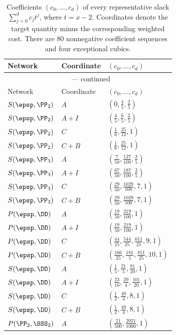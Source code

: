 \begingroup\renewcommand{\arraystretch}{1.25}
\begin{longtable}{lll}
\caption{Coefficients $(c_0,\ldots,c_d)$ of every representative slack $\sum_{j=0}^d c_jt^j$, where $t=x-2$. Coordinates denote the target quantity minus the corresponding weighted cost. There are 80 nonnegative coefficient sequences and four exceptional cubics.}\label{tab:slacks}\\
\toprule
Network & Coordinate & $(c_0,\ldots,c_d)$\\ \midrule
\endfirsthead
\multicolumn{3}{c}{\tablename~\thetable{} --- continued}\\[3pt]
\toprule
Network & Coordinate & $(c_0,\ldots,c_d)$\\ \midrule
\endhead
$S(\epsp,\PP_2)$ & $A$ & $(0, \frac{4}{5}, \frac{2}{5})$ \\
$S(\epsp,\PP_2)$ & $A+I$ & $(\frac{4}{5}, \frac{6}{5}, \frac{2}{5})$ \\
$S(\epsp,\PP_2)$ & $C$ & $(\frac{1}{6}, \frac{25}{12}, 1)$ \\
$S(\epsp,\PP_2)$ & $C+B$ & $(\frac{1}{6}, \frac{25}{12}, 1)$ \\
$S(\epsp,\PP_3)$ & $A$ & $(\frac{7}{50}, \frac{127}{100}, \frac{3}{5})$ \\
$S(\epsp,\PP_3)$ & $A+I$ & $(\frac{67}{50}, \frac{187}{100}, \frac{3}{5})$ \\
$S(\epsp,\PP_3)$ & $C$ & $(\frac{29}{50}, \frac{1029}{100}, 7, 1)$ \\
$S(\epsp,\PP_3)$ & $C+B$ & $(\frac{29}{50}, \frac{1029}{100}, 7, 1)$ \\
$P(\epsp,\DD)$ & $A$ & $(\frac{19}{50}, \frac{219}{100}, 1)$ \\
$P(\epsp,\DD)$ & $A+I$ & $(\frac{19}{50}, \frac{219}{100}, 1)$ \\
$P(\epsp,\DD)$ & $C$ & $(\frac{44}{25}, \frac{544}{25}, \frac{611}{25}, 9, 1)$ \\
$P(\epsp,\DD)$ & $C+B$ & $(\frac{166}{25}, \frac{181}{5}, \frac{811}{25}, 10, 1)$ \\
$S(\epsp,\DD)$ & $A$ & $(\frac{1}{5}, \frac{21}{5}, \frac{81}{20}, 1)$ \\
$S(\epsp,\DD)$ & $A+I$ & $(\frac{23}{10}, \frac{29}{4}, \frac{101}{20}, 1)$ \\
$S(\epsp,\DD)$ & $C$ & $(\frac{1}{2}, \frac{49}{4}, 8, 1)$ \\
$S(\epsp,\DD)$ & $C+B$ & $(\frac{1}{2}, \frac{49}{4}, 8, 1)$ \\
$P(\PP_2,\SSS_2)$ & $A$ & $(\frac{21}{500}, \frac{2021}{1000}, 1)$ \\

\end{longtable}
